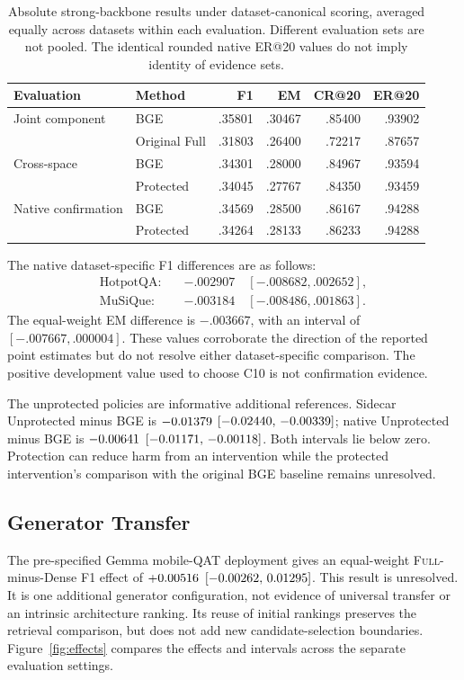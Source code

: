 \documentclass[11pt,a4paper]{article}
\newcommand{\full}{\textsc{Full}\xspace}
\begin{document}
\begin{table}[t]
\centering\small
\begin{tabular}{@{}llrrrr@{}}
\toprule
Evaluation & Method & F1 & EM & CR@20 & ER@20\\
\midrule
Joint component & BGE & .35801 & .30467 & .85400 & .93902\\
 & Original Full & .31803 & .26400 & .72217 & .87657\\
Cross-space & BGE & .34301 & .28000 & .84967 & .93594\\
 & Protected & .34045 & .27767 & .84350 & .93459\\
Native confirmation & BGE & .34569 & .28500 & .86167 & .94288\\
 & Protected & .34264 & .28133 & .86233 & .94288\\
\bottomrule
\end{tabular}
\caption{Absolute strong-backbone results under dataset-canonical scoring, averaged
equally across datasets within each evaluation. Different evaluation sets
are not pooled. The identical rounded native ER@20 values do not imply
identity of evidence sets.}
\label{tab:strong}
\end{table}

The native dataset-specific F1 differences are as follows:
\begin{align*}
\text{HotpotQA:}\quad &-.002907\quad [-.008682,.002652],\\
\text{MuSiQue:}\quad &-.003184\quad [-.008486,.001863].
\end{align*}
The equal-weight EM difference is $-.003667$, with an interval of
$[-.007667,.000004]$. These values corroborate the direction
of the reported point estimates but do not resolve either dataset-specific
comparison. The positive development value used to choose C10 is not
confirmation evidence.

The unprotected policies are informative additional references. Sidecar
Unprotected minus BGE is $-0.01379$
$[-0.02440,\,-0.00339]$; native Unprotected minus BGE is
$-0.00641$ $[-0.01171,\,-0.00118]$.
Both intervals lie below zero. Protection can reduce harm from an
intervention while the protected intervention's comparison with the original
BGE baseline remains unresolved.

\subsection{Generator Transfer}
The pre-specified Gemma mobile-QAT deployment gives an equal-weight
\full-minus-Dense F1 effect of $+0.00516$ $[-0.00262,\,0.01295]$.
This result is unresolved. It is one additional generator configuration,
not evidence of universal transfer or an intrinsic architecture ranking.
Its reuse of initial rankings preserves the retrieval comparison, but does
not add new candidate-selection boundaries.
Figure~\ref{fig:effects} compares the effects and intervals across the
separate evaluation settings.
\end{document}
